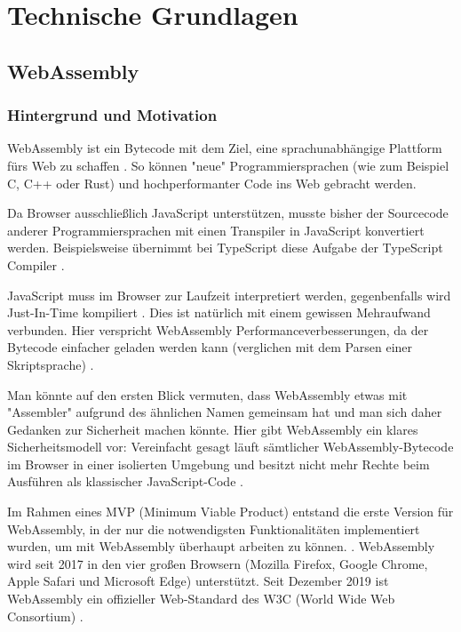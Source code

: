 \chapter{Technische Grundlagen}

\section{WebAssembly}
\subsection{Hintergrund und Motivation}
WebAssembly ist ein Bytecode mit dem Ziel, eine sprachunabhängige Plattform fürs Web zu schaffen \cite{WebAssemblyWebsite} \cite{WebAssemblySpecification}. So können "neue" Programmiersprachen (wie zum Beispiel C, C++ oder Rust) und hochperformanter Code ins Web gebracht werden.

Da Browser ausschließlich JavaScript unterstützen, musste bisher der Sourcecode anderer Programmiersprachen mit einen Transpiler in JavaScript konvertiert werden. Beispielsweise übernimmt bei TypeScript diese Aufgabe der TypeScript Compiler \cite{TypeScript}.

JavaScript muss im Browser zur Laufzeit interpretiert werden, gegenbenfalls wird Just-In-Time kompiliert \cite{MDNJavaScript}. Dies ist natürlich mit einem gewissen Mehraufwand verbunden. Hier verspricht WebAssembly Performanceverbesserungen, da der Bytecode einfacher geladen werden kann (verglichen mit dem Parsen einer Skriptsprache) \cite{WebAssemblySpecification}.

Man könnte auf den ersten Blick vermuten, dass WebAssembly etwas mit "Assembler" aufgrund des ähnlichen Namen gemeinsam hat und man sich daher Gedanken zur Sicherheit machen könnte. Hier gibt WebAssembly ein klares Sicherheitsmodell vor: Vereinfacht gesagt läuft sämtlicher WebAssembly-Bytecode im Browser in einer isolierten Umgebung und besitzt nicht mehr Rechte beim Ausführen als klassischer JavaScript-Code \cite{WebAssemblyWebsite} \cite{WebAssemblyW3CPressStandard}.

Im Rahmen eines MVP (Minimum Viable Product) entstand die erste Version für WebAssembly, in der nur die notwendigsten Funktionalitäten implementiert wurden, um mit WebAssembly überhaupt arbeiten zu können. \cite{WebAssemblyWebsite}. WebAssembly wird seit 2017 in den vier großen Browsern (Mozilla Firefox, Google Chrome, Apple Safari und Microsoft Edge) unterstützt. Seit Dezember 2019 ist WebAssembly ein offizieller Web-Standard des W3C (World Wide Web Consortium) \cite{WebAssemblyW3CPressStandard}.

